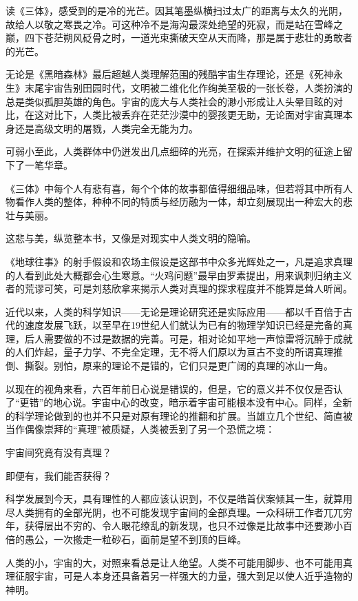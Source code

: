 \documentclass[openany,scheme = chinese, linespread = 1.5]{ctexbook}
\begin{document}
读《三体》，感受到的是冷的光芒。因其笔墨纵横扫过太广的距离与太久的光阴，故给人以敬之寒畏之冷。可这种冷不是海沟最深处绝望的死寂，而是站在雪峰之巅，四下苍茫朔风砭骨之时，一道光束撕破天空从天而降，那是属于悲壮的勇敢者的光芒。

无论是《黑暗森林》最后超越人类理解范围的残酷宇宙生存理论，还是《死神永生》末尾宇宙告别田园时代，文明被二维化化作绚美至极的一张长卷，人类扮演的总是类似孤胆英雄的角色。宇宙的庞大与人类社会的渺小形成让人头晕目眩的对比，在这对比下，人类比被丢弃在茫茫沙漠中的婴孩更无助，无论面对宇宙真理本身还是高级文明的屠戮，人类完全无能为力。

可弱小至此，人类群体中仍迸发出几点细碎的光亮，在探索并维护文明的征途上留下了一笔华章。

《三体》中每个人有悲有喜，每个个体的故事都值得细细品味，但若将其中所有人物看作人类的整体，种种不同的特质与经历融为一体，却立刻展现出一种宏大的悲壮与美丽。

这悲与美，纵览整本书，又像是对现实中人类文明的隐喻。

《地球往事》的射手假设和农场主假设是这部书中众多光辉处之一，凡是追求真理的人看到此处大概都会心生寒意。“火鸡问题”最早由罗素提出，用来讽刺归纳主义者的荒谬可笑，可是刘慈欣拿来揭示人类对真理的探求程度并不能算是耸人听闻。

近代以来，人类的科学知识——无论是理论研究还是实际应用——都以千百倍于古代的速度发展飞跃，以至早在19世纪人们就认为已有的物理学知识已经是完备的真理，后人需要做的不过是数据的完善。可是，相对论如平地一声惊雷将沉醉于成就的人们炸起，量子力学、不完全定理，无不将人们原以为亘古不变的所谓真理推倒、撕裂。别怕，原来的理论不是错的，它们只是更广阔的真理的冰山一角。

以现在的视角来看，六百年前日心说是错误的，但是，它的意义并不仅仅是否认了“更错”的地心说。宇宙中心的改变，暗示着宇宙可能根本没有中心。同样，全新的科学理论做到的也并不只是对原有理论的推翻和扩展。当雄立几个世纪、简直被当作偶像崇拜的“真理”被质疑，人类被丢到了另一个恐慌之境：

宇宙间究竟有没有真理？

即便有，我们能否获得？

科学发展到今天，具有理性的人都应该认识到，不仅是皓首伏案倾其一生，就算用尽人类拥有的全部光阴，也不可能发现宇宙间的全部真理。一众科研工作者兀兀穷年，获得层出不穷的、令人眼花缭乱的新发现，也只不过像是比故事中还要渺小百倍的愚公，一次搬走一粒砂石，面前是望不到顶的巨峰。

人类的小，宇宙的大，对照来看总是让人绝望。人类不可能用脚步、也不可能用真理征服宇宙，可是人本身还具备着另一样强大的力量，强大到足以使人近乎造物的神明。
\end{document}
